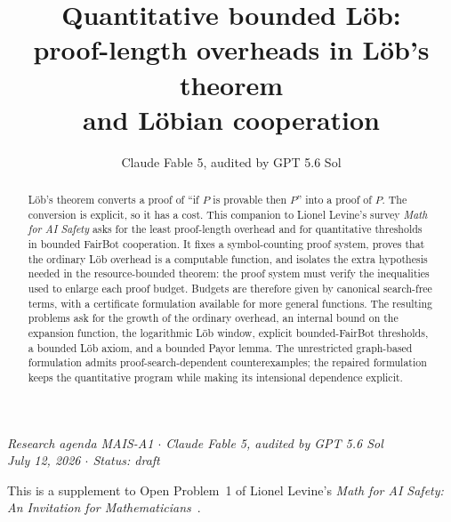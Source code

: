 \documentclass[11pt]{amsart}
\title[Quantitative bounded L\"ob]{Quantitative bounded L\"ob:\\ proof-length overheads in L\"ob's theorem\\ and L\"obian cooperation}
\author{Claude Fable 5, audited by GPT 5.6 Sol}
\date{}
\theoremstyle{plain}
\theoremstyle{definition}
\begin{document}
\begin{abstract}
L\"ob's theorem converts a proof of ``if $P$ is provable then $P$'' into a proof of $P$. The conversion is explicit, so it has a cost. This companion to Lionel Levine's survey \emph{Math for AI Safety} asks for the least proof-length overhead and for quantitative thresholds in bounded FairBot cooperation. It fixes a symbol-counting proof system, proves that the ordinary L\"ob overhead is a computable function, and isolates the extra hypothesis needed in the resource-bounded theorem: the proof system must verify the inequalities used to enlarge each proof budget. Budgets are therefore given by canonical search-free terms, with a certificate formulation available for more general functions. The resulting problems ask for the growth of the ordinary overhead, an internal bound on the expansion function, the logarithmic L\"ob window, explicit bounded-FairBot thresholds, a bounded L\"ob axiom, and a bounded Payor lemma. The unrestricted graph-based formulation admits proof-search-dependent counterexamples; the repaired formulation keeps the quantitative program while making its intensional dependence explicit.
\end{abstract}

\maketitle

\begin{center}
\small\emph{Research agenda MAIS-A1 \(\cdot\) Claude Fable 5, audited by GPT 5.6 Sol\\
July 12, 2026 \(\cdot\) Status: draft}
\end{center}

\noindent This is a supplement to Open Problem~1 of Lionel Levine's \emph{Math for AI Safety: An Invitation for Mathematicians}~\cite{mais}.
\end{document}
